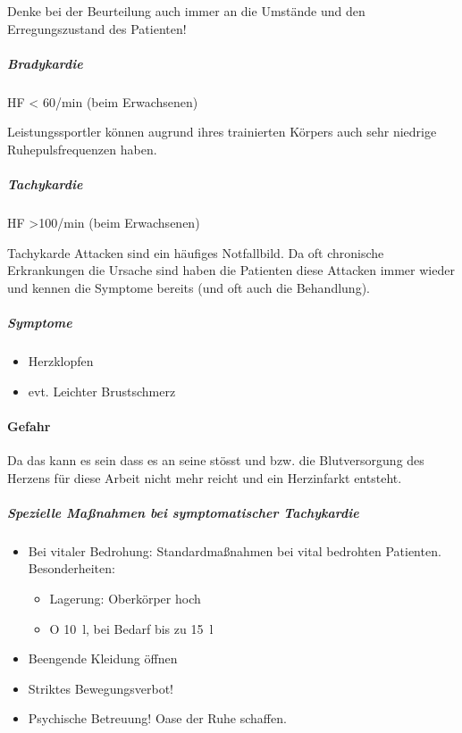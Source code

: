 Denke bei der Beurteilung auch immer an die Umstände und den
Erregungszustand des Patienten!

\subparagraph{Bradykardie}
HF {\textless} 60/min (beim Erwachsenen)

Leistungssportler k\"onnen augrund ihres trainierten K\"orpers auch sehr
niedrige Ruhepulsfrequenzen haben. 

\subparagraph{Tachykardie }
HF {\textgreater}100/min (beim Erwachsenen)

Tachykarde Attacken sind ein häufiges Notfallbild. Da oft chronische
Erkrankungen die Ursache sind  haben die Patienten diese Attacken immer
wieder und kennen die Symptome bereits (und oft auch die Behandlung). 

\subparagraph*{Symptome}

\begin{itemize}
    \item {\mdseries
    Herzklopfen}
    
    \item {\mdseries
    evt. Leichter Brustschmerz}
    
\end{itemize}

\paragraph{Gefahr}

Da das  kann es sein dass es an seine 
st\"osst und  bzw. die Blutversorgung
des Herzens f\"ur diese Arbeit nicht mehr reicht und ein Herzinfarkt
entsteht.

\begin{gMassnahmenEnv}
    \subparagraph*{Spezielle Ma{\ss}nahmen bei symptomatischer Tachykardie}
    
    \begin{itemize}
        \item Bei vitaler Bedrohung: Standardma{\ss}nahmen bei vital bedrohten
        Patienten. Besonderheiten: 
        \begin{itemize}
            \item Lagerung: Oberk\"orper hoch
            \item O 10~l, bei Bedarf bis zu 15~l
        \end{itemize}
        \item Beengende Kleidung \"offnen
        \item Striktes Bewegungsverbot!
        \item Psychische Betreuung! Oase der Ruhe schaffen. 
    \end{itemize}

\end{gMassnahmenEnv}




